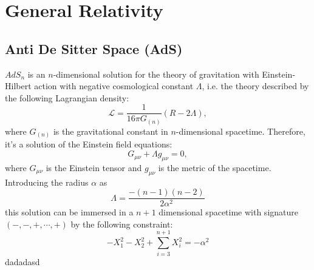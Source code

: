 \chapter{General Relativity}
\adjustmtc
\minitoc
\section{Anti De Sitter Space (AdS)}
$AdS_n$ is an $n$-dimensional solution for the theory of gravitation with Einstein-Hilbert action with negative cosmological constant $\Lambda$, i.e. the theory described by the following Lagrangian density:
\begin{equation}
\mathcal{L} = \frac{1}{16\pi G_{(n)}}(R-2\Lambda),
\end{equation}
where $G_{(n)}$ is the gravitational constant in $n$-dimensional spacetime. Therefore, it's a solution of the Einstein field equations:
\begin{equation}
G_{\mu\nu} + \Lambda g_{\mu\nu} = 0,
\end{equation}
where $G_{\mu\nu}$ is the Einstein tensor and $g_{\mu\nu}$ is the metric of the spacetime. Introducing the radius $\alpha$ as 
\begin{equation}
\Lambda = \frac{-(n-1)(n-2)}{2\alpha^2}
\end{equation}
this solution can be immersed in a $n+1$ dimensional spacetime with signature $(-,-,+,\cdots,+)$ by the following constraint:
\begin{equation}
-X^2_1 - X^2_2 + \sum_{i=3}^{n+1}X_i^2 = -\alpha^2
\end{equation}
dadadasd
